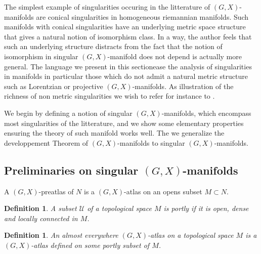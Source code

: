 \documentclass[a4paper,12pt]{article}
\newtheorem{defi}[lem]{Definition}    %
\def\U{\mathcal U}
\def\U{\mathcal{U}}
\begin{document}
The simplest example of singularities occuring in the litterature of $(G,X)$-manifolds are conical singularities in homogeneous riemannian manifolds. Such manifolds with conical singularities have an underlying metric space structure that gives a natural notion of isomorphism class. In a way, the author feels that such an underlying structure distracts from the fact that the notion of isomorphism in singular $(G,X)$-manifold does not depend is actually more general. The language we present in this sectionease the analysis of  singularities in manifolds in particular those which do not admit a natural metric structure such as Lorentzian or projective $(G,X)$-manifolds. As illustration of the richness of non metric singularities we wish to refer for instance to \cite{Particules_1}.

We begin by defining a notion of singular $(G,X)$-manifolds, which encompass most singularities of the litterature, and we show some elementary properties ensuring the theory of such manifold works well. The we generalize the developpement Theorem of $(G,X)$-manifolds to singular $(G,X)$-manifolds. 



\subsection{Preliminaries on singular $(G,X)$-manifolds}
A $(G,X)$-preatlas of $N$ is a $(G,X)$-atlas on an opens subset $M\subset N$.
\begin{defi}\label{def:subset_topological_space_portly} A subset $\U$ of a topological space $M$ is  portly if it is open, dense and locally connected in $M$.
 
\end{defi}

\begin{defi}\label{def:almost_everywhere_atlas_topological} An almost everywhere $(G,X)$-atlas on a topological space $M$ is a $(G,X)$-atlas defined on some portly subset of $M$. 
\end{defi}
\end{document}
